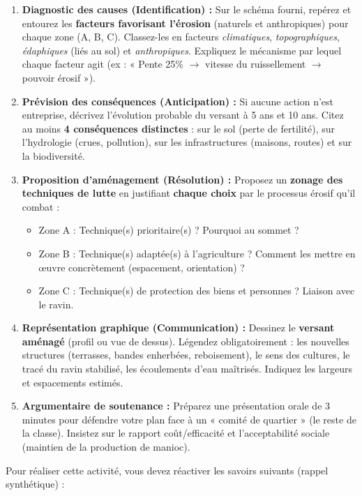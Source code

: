 \documentclass[11pt]{article}
\newcounter{popsec}
\newcounter{popsub}
\newcommand{\courssub}[1]{%
  \stepcounter{popsub}%
  \par\vspace{9pt}\noindent{\popxbold\fontsize{11.5}{13}\selectfont\color{popink}{\color{poporange}\thepopsec.\thepopsub}\hspace{6pt}#1}\par\nopagebreak\vspace{4pt}
}
\begin{document}
\begin{enumerate}
    \item \textbf{Diagnostic des causes (Identification) :} Sur le schéma fourni, repérez et entourez les \textbf{facteurs favorisant l'érosion} (naturels et anthropiques) pour chaque zone (A, B, C). Classez-les en facteurs \emph{climatiques}, \emph{topographiques}, \emph{édaphiques} (liés au sol) et \emph{anthropiques}. Expliquez le mécanisme par lequel chaque facteur agit (ex : « Pente 25\% $\rightarrow$ vitesse du ruissellement $\rightarrow$ pouvoir érosif »).
    \item \textbf{Prévision des conséquences (Anticipation) :} Si aucune action n'est entreprise, décrivez l'évolution probable du versant à 5 ans et 10 ans. Citez au moins \textbf{4 conséquences distinctes} : sur le sol (perte de fertilité), sur l'hydrologie (crues, pollution), sur les infrastructures (maisons, routes) et sur la biodiversité.
    \item \textbf{Proposition d'aménagement (Résolution) :} Proposez un \textbf{zonage des techniques de lutte} en justifiant \textbf{chaque choix} par le processus érosif qu'il combat :
    \begin{itemize}
        \item Zone A : Technique(s) prioritaire(s) ? Pourquoi au sommet ?
        \item Zone B : Technique(s) adaptée(s) à l'agriculture ? Comment les mettre en œuvre concrètement (espacement, orientation) ?
        \item Zone C : Technique(s) de protection des biens et personnes ? Liaison avec le ravin.
    \end{itemize}
    \item \textbf{Représentation graphique (Communication) :} Dessinez le \textbf{versant aménagé} (profil ou vue de dessus). Légendez obligatoirement : les nouvelles structures (terrasses, bandes enherbées, reboisement), le sens des cultures, le tracé du ravin stabilisé, les écoulements d'eau maîtrisés. Indiquez les largeurs et espacements estimés.
    \item \textbf{Argumentaire de soutenance :} Préparez une présentation orale de 3 minutes pour défendre votre plan face à un « comité de quartier » (le reste de la classe). Insistez sur le rapport coût/efficacité et l'acceptabilité sociale (maintien de la production de manioc).
\end{enumerate}

\courssub{Ressources à mobiliser}
Pour réaliser cette activité, vous devez réactiver les savoirs suivants (rappel synthétique) :
\end{document}
